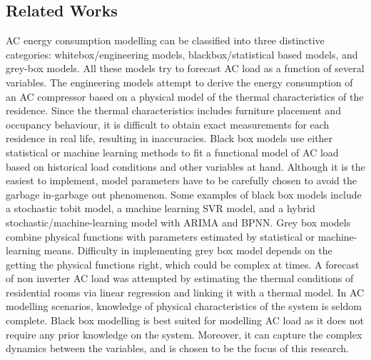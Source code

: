 \documentclass[conference]{IEEEtran}
\begin{document}
\subsection{Related Works}
  AC energy consumption modelling can be classified into three distinctive categories: whitebox/engineering models, blackbox/statistical based models, and grey-box models. All these models try to forecast AC load as a function of several variables. The engineering models attempt to derive the energy consumption of an AC compressor based on a physical model of the thermal characteristics of the residence\cite{zhang2013}. Since the thermal characteristics includes furniture placement and occupancy behaviour, it is difficult to obtain exact measurements for each residence in real life, resulting in inaccuracies. Black box models use either statistical or machine learning methods to fit a functional model of AC load based on historical load conditions and other variables at hand. Although it is the easiest to implement, model parameters have to be carefully chosen to avoid the garbage in-garbage out phenomenon. Some examples of black box models include a stochastic tobit model\cite{Horowitz2014}, a machine learning SVR model\cite{xuan2015}, and a hybrid stochastic/machine-learning model with ARIMA and BPNN\cite{xuemei2009}. Grey box models combine physical functions with parameters estimated by statistical or machine-learning means. Difficulty in implementing grey box model depends on the getting the physical functions right, which could be complex at times. A forecast of non inverter AC load was attempted by estimating the thermal conditions of residential rooms  via linear regression and linking it with a thermal model\cite{jain2016}. In AC modelling scenarios, knowledge of physical characteristics of the system is seldom complete. Black box modelling is best suited for modelling AC load as it does not require any prior knowledge on the system. Moreover, it can capture the complex dynamics between the variables, and is chosen to be the focus of this research.
   
\end{document}
